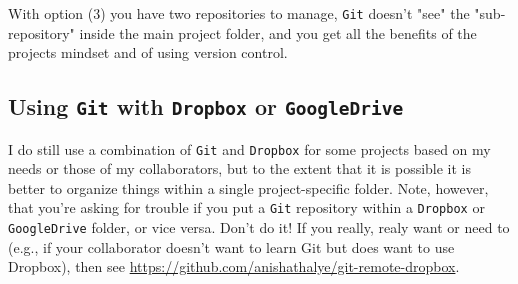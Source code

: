 \documentclass[12pt,letterpaper]{article}
\begin{document}
\noindent
With option (3) you have two repositories to manage, \texttt{Git} doesn't "see" the "sub-repository" inside the main project folder, and you get all the benefits of the projects mindset and of using version control. 


\subsection{Using \texttt{Git} with \texttt{Dropbox} or \texttt{GoogleDrive}}

I do still use a combination of \texttt{Git} and \texttt{Dropbox} for some projects based on my needs
or those of my collaborators, 
but to the extent that it is possible it is better to organize things within a single project-specific folder.
Note, however, that you're asking for trouble if you put a \texttt{Git} repository within a \texttt{Dropbox} or \texttt{GoogleDrive} folder, or vice versa.  
Don't do it!  
If you really, realy want or need to 
(e.g., if your collaborator doesn't want to learn Git but does want to use Dropbox), 
then see \url{https://github.com/anishathalye/git-remote-dropbox}.
\end{document}
